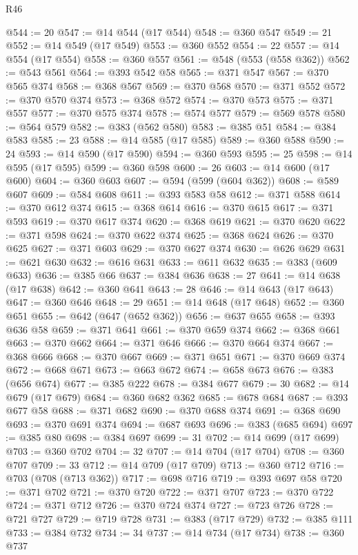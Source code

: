 \begin{lexlean}{R46}
\begin{coremodule}
@544 := 20
@547 := @14 @544 (@17 @544)
@548 := @360 @547
@549 := 21
@552 := @14 @549 (@17 @549)
@553 := @360 @552
@554 := 22
@557 := @14 @554 (@17 @554)
@558 := @360 @557
@561 := @548 (@553 (@558 @362))
@562 := @543 @561
@564 := @393 @542 @58
@565 := @371 @547
@567 := @370 @565 @374
@568 := @368 @567
@569 := @370 @568
@570 := @371 @552
@572 := @370 @570 @374
@573 := @368 @572
@574 := @370 @573
@575 := @371 @557
@577 := @370 @575 @374
@578 := @574 @577
@579 := @569 @578
@580 := @564 @579
@582 := @383 (@562 @580)
@583 := @385 @51
@584 := @384 @583
@585 := 23
@588 := @14 @585 (@17 @585)
@589 := @360 @588
@590 := 24
@593 := @14 @590 (@17 @590)
@594 := @360 @593
@595 := 25
@598 := @14 @595 (@17 @595)
@599 := @360 @598
@600 := 26
@603 := @14 @600 (@17 @600)
@604 := @360 @603
@607 := @594 (@599 (@604 @362))
@608 := @589 @607
@609 := @584 @608
@611 := @393 @583 @58
@612 := @371 @588
@614 := @370 @612 @374
@615 := @368 @614
@616 := @370 @615
@617 := @371 @593
@619 := @370 @617 @374
@620 := @368 @619
@621 := @370 @620
@622 := @371 @598
@624 := @370 @622 @374
@625 := @368 @624
@626 := @370 @625
@627 := @371 @603
@629 := @370 @627 @374
@630 := @626 @629
@631 := @621 @630
@632 := @616 @631
@633 := @611 @632
@635 := @383 (@609 @633)
@636 := @385 @66
@637 := @384 @636
@638 := 27
@641 := @14 @638 (@17 @638)
@642 := @360 @641
@643 := 28
@646 := @14 @643 (@17 @643)
@647 := @360 @646
@648 := 29
@651 := @14 @648 (@17 @648)
@652 := @360 @651
@655 := @642 (@647 (@652 @362))
@656 := @637 @655
@658 := @393 @636 @58
@659 := @371 @641
@661 := @370 @659 @374
@662 := @368 @661
@663 := @370 @662
@664 := @371 @646
@666 := @370 @664 @374
@667 := @368 @666
@668 := @370 @667
@669 := @371 @651
@671 := @370 @669 @374
@672 := @668 @671
@673 := @663 @672
@674 := @658 @673
@676 := @383 (@656 @674)
@677 := @385 @222
@678 := @384 @677
@679 := 30
@682 := @14 @679 (@17 @679)
@684 := @360 @682 @362
@685 := @678 @684
@687 := @393 @677 @58
@688 := @371 @682
@690 := @370 @688 @374
@691 := @368 @690
@693 := @370 @691 @374
@694 := @687 @693
@696 := @383 (@685 @694)
@697 := @385 @80
@698 := @384 @697
@699 := 31
@702 := @14 @699 (@17 @699)
@703 := @360 @702
@704 := 32
@707 := @14 @704 (@17 @704)
@708 := @360 @707
@709 := 33
@712 := @14 @709 (@17 @709)
@713 := @360 @712
@716 := @703 (@708 (@713 @362))
@717 := @698 @716
@719 := @393 @697 @58
@720 := @371 @702
@721 := @370 @720
@722 := @371 @707
@723 := @370 @722
@724 := @371 @712
@726 := @370 @724 @374
@727 := @723 @726
@728 := @721 @727
@729 := @719 @728
@731 := @383 (@717 @729)
@732 := @385 @111
@733 := @384 @732
@734 := 34
@737 := @14 @734 (@17 @734)
@738 := @360 @737

\end{coremodule}
\end{lexlean}
